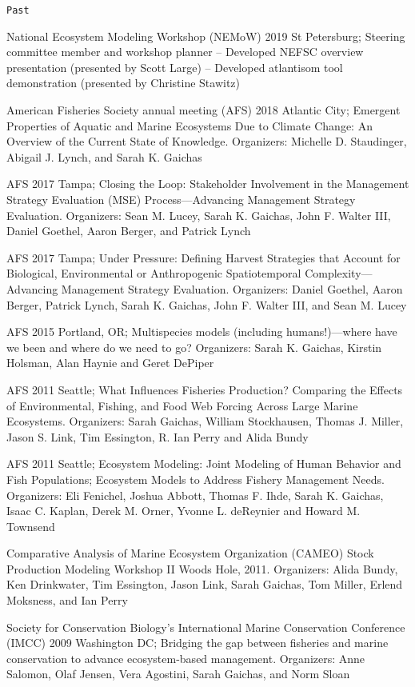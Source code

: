 \documentclass[11pt, a4paper]{awesome-cv}
\begin{document}
\begin{verbatim}
Past
\end{verbatim}

National Ecosystem Modeling Workshop (NEMoW) 2019 St Petersburg;
Steering committee member and workshop planner -- Developed NEFSC
overview presentation (presented by Scott Large) -- Developed atlantisom
tool demonstration (presented by Christine Stawitz)

American Fisheries Society annual meeting (AFS) 2018 Atlantic City;
Emergent Properties of Aquatic and Marine Ecosystems Due to Climate
Change: An Overview of the Current State of Knowledge. Organizers:
Michelle D. Staudinger, Abigail J. Lynch, and Sarah K. Gaichas

AFS 2017 Tampa; Closing the Loop: Stakeholder Involvement in the
Management Strategy Evaluation (MSE) Process---Advancing Management
Strategy Evaluation. Organizers: Sean M. Lucey, Sarah K. Gaichas, John
F. Walter III, Daniel Goethel, Aaron Berger, and Patrick Lynch

AFS 2017 Tampa; Under Pressure: Defining Harvest Strategies that Account
for Biological, Environmental or Anthropogenic Spatiotemporal
Complexity---Advancing Management Strategy Evaluation. Organizers:
Daniel Goethel, Aaron Berger, Patrick Lynch, Sarah K. Gaichas, John F.
Walter III, and Sean M. Lucey

AFS 2015 Portland, OR; Multispecies models (including humans!)---where
have we been and where do we need to go? Organizers: Sarah K. Gaichas,
Kirstin Holsman, Alan Haynie and Geret DePiper

AFS 2011 Seattle; What Influences Fisheries Production? Comparing the
Effects of Environmental, Fishing, and Food Web Forcing Across Large
Marine Ecosystems. Organizers: Sarah Gaichas, William Stockhausen,
Thomas J. Miller, Jason S. Link, Tim Essington, R. Ian Perry and Alida
Bundy

AFS 2011 Seattle; Ecosystem Modeling: Joint Modeling of Human Behavior
and Fish Populations; Ecosystem Models to Address Fishery Management
Needs. Organizers: Eli Fenichel, Joshua Abbott, Thomas F. Ihde, Sarah K.
Gaichas, Isaac C. Kaplan, Derek M. Orner, Yvonne L. deReynier and Howard
M. Townsend

Comparative Analysis of Marine Ecosystem Organization (CAMEO) Stock
Production Modeling Workshop II Woods Hole, 2011. Organizers: Alida
Bundy, Ken Drinkwater, Tim Essington, Jason Link, Sarah Gaichas, Tom
Miller, Erlend Moksness, and Ian Perry

Society for Conservation Biology's International Marine Conservation
Conference (IMCC) 2009 Washington DC; Bridging the gap between fisheries
and marine conservation to advance ecosystem-based management.
Organizers: Anne Salomon, Olaf Jensen, Vera Agostini, Sarah Gaichas, and
Norm Sloan
\end{document}
